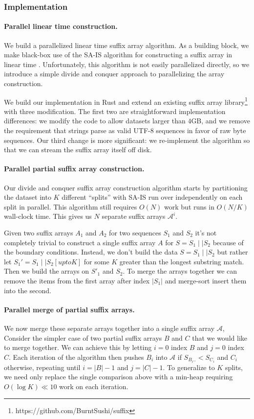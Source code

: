 \subsubsection{Implementation}
\paragraph{Parallel linear time construction.}
We build a parallelized linear time suffix array algorithm.
%
As a building block, we make black-box use of the SA-IS algorithm for
constructing a suffix array in linear time \citet{nong2009linear,ko2003space}.
%
Unfortunately, this algorithm is not easily parallelized directly, so
we introduce a simple divide and conquer approach to parallelizing the array construction.


We build our implementation in Rust and extend an existing suffix array library\footnote{https://github.com/BurntSushi/suffix}
with three modification.
The first two are straightforward implementation differences:
we modify the code to allow datasets larger than $4$GB,
and we remove the requirement that strings parse as valid UTF-8 sequences in favor of raw byte sequences.
Our third change is more significant: we re-implement the algorithm
so that we can stream the suffix array itself off disk.

\paragraph{Parallel partial suffix array construction.}
%
Our divide and conquer suffix array construction algorithm starts by 
partitioning the dataset into $K$ different ``splits'' with SA-IS run
over independently on each split in parallel.
%
This algorithm still requires $O(N)$ work but runs in $O(N/K)$ wall-clock time.
%
This gives us $N$ separate suffix arrays $\mathcal{A}^i$.

Given two suffix arrays $A_1$ and $A_2$ for two sequences $S_1$ and $S_2$ it's not completely trivial to construct a single suffix array $A$ for $S = S_1 \mid\mid S_2$ 
because of the boundary conditions.
Instead, we don't build the data $S = S_1 \mid\mid S_2$ but rather let $S_1' = S_1 \mid\mid S_2[upto K]$ for some $K$ greater than the longest substring match.
Then we build the arrays on $S'_1$ and $S_2$.
To merge the arrays together we can remove the items from the first array after index $|S_1|$ and merge-sort insert them into the second.

\paragraph{Parallel merge of partial suffix arrays.}
We now merge these separate arrays together into a single suffix array $\mathcal{A}$,
%
Consider the simpler case of two partial suffix arrays $B$ and $C$ that we 
would like to merge together.
%
We can achieve this by letting $i=0$ index $B$ and $j=0$ index $C$.
%
Each iteration of the algorithm then pushes $B_i$ into $\mathcal{A}$ if
$S_{B_i..} < S_{C_i}$ and $C_i$ otherwise, repeating until $i=|B|-1$ and $j=|C|-1$.
%
To generalize to $K$ splits, we need only replace the single comparison above with
a min-heap requiring $O(\log{K}) \ll 10$ work on each iteration.

